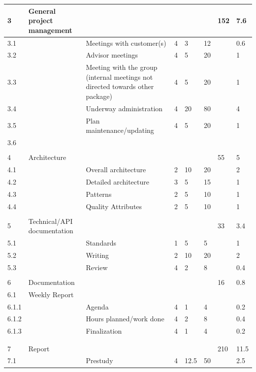 \begin{longtable}{|p{0.7cm}|p{3cm}|p{2cm}|p{2cm}|p{2cm}|p{2cm}|p{2cm}|p{2cm}|}
\hline
3 & General project management &  &  &  &  & 152 & 7.6\\ 
\hline
3.1 &  & Meetings with customer(s)  & 4 & 3 & 12 &  & 0.6\\ 
\hline
3.2 &  & Advisor meetings  & 4 & 5 & 20 &  & 1\\ 
\hline
3.3 &  & Meeting with the group (internal meetings not directed towards other package) & 4 & 5 & 20 &  & 1\\ 
\hline
3.4 &  & Underway administration & 4 & 20 & 80 &  & 4\\ 
\hline
3.5 &  & Plan maintenance/updating & 4 & 5 & 20 &  & 1\\ 
\hline
3.6 &  &  &  &  &  &  & \\ 
\hline
 &  &  &  &  &  &  & \\ 
\hline
4 & Architecture &  &  &  &  & 55 & 5\\ 
\hline
4.1 &  & Overall architecture & 2 & 10 & 20 &  & 2\\ 
\hline
4.2 &  & Detailed architecture & 3 & 5 & 15 &  & 1\\ 
\hline
4.3 &  & Patterns & 2 & 5 & 10 &  & 1\\ 
\hline
4.4 &  & Quality Attributes & 2 & 5 & 10 &  & 1\\ 
\hline
 &  &  &  &  &  &  & \\ 
\hline
5 & Technical/API documentation &  &  &  &  & 33 & 3.4\\ 
\hline
5.1 &  & Standards & 1 & 5 & 5 &  & 1\\ 
\hline
5.2 &  & Writing & 2 & 10 & 20 &  & 2\\ 
\hline
5.3 &  & Review & 4 & 2 & 8 &  & 0.4\\ 
\hline
 &  &  &  &  &  &  & \\ 
\hline
6 & Documentation &  &  &  &  & 16 & 0.8\\ 
\hline
6.1 & Weekly Report &  &  &  &  &  & \\ 
\hline
6.1.1 &  & Agenda & 4 & 1 & 4 &  & 0.2\\ 
\hline
6.1.2 &  & Hours planned/work done & 4 & 2 & 8 &  & 0.4\\ 
\hline
6.1.3 &  & Finalization & 4 & 1 & 4 &  & 0.2\\ 
\hline
 &  &  &  &  &  &  & \\ 
\hline
 &  &  &  &  &  &  & \\ 
\hline
7 & Report &  &  &  &  & 210 & 11.5\\ 
\hline
7.1 &  & Prestudy & 4 & 12.5 & 50 &  & 2.5\\ 

\end{longtable}
